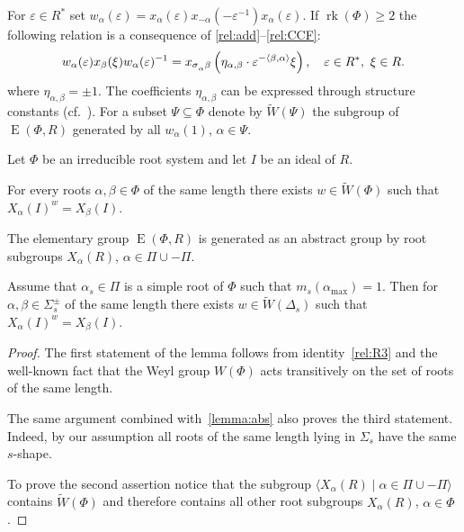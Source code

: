 \documentclass[12pt]{amsart}
\numberwithin{equation}{section}
\theoremstyle{definition}
\DeclareMathOperator{\E}{E}
\DeclareMathOperator{\rk}{rk}
\def\ssub#1{\mathchoice
   {_{\lower2pt\hbox{$\scriptstyle #1$}}}
   {_{\lower2pt\hbox{$\scriptstyle #1$}}}
   {_{\lower1.5pt\hbox{$\scriptscriptstyle #1$}}}
   {_{\!\lower1.5pt\hbox{$\scriptscriptstyle #1$}}}}
\begin{document}
For $\varepsilon\in R^*$ set $w_\alpha(\varepsilon) = x_\alpha(\varepsilon) x_{-\alpha}(-\varepsilon^{-1}) x_{\alpha}(\varepsilon).$
If $\rk(\Phi)\geqslant 2$ the following relation is a consequence of \ref{rel:add}--\ref{rel:CCF}:
\begin{equation}\label{rel:R3}
w_\alpha(\varepsilon) x_{\beta}(\xi) w_\alpha(\varepsilon)^{-1} =
x_{\sigma\ssub{\alpha}\beta} \left(\eta_{\alpha, \beta}\cdot\varepsilon^{-\langle\beta,\alpha \rangle}\xi\right),\quad \varepsilon\in R^*,\ \xi\in R.
\end{equation}
where $\eta_{\alpha, \beta}=\pm 1$. The coefficients $\eta_{\alpha, \beta}$ can be expressed through structure constants (cf.~\cite[\S13]{VP}).
For a subset $\Psi \subseteq \Phi$ denote by $\widetilde{W}(\Psi)$ the subgroup of $\E(\Phi, R)$ generated by all $w_{\alpha}(1)$, $\alpha \in \Psi$.
\begin{lemma} \label{lemma:weylfacts} Let $\Phi$ be an irreducible root system and let $I$ be an ideal of $R$. 
\begin{thmlist}
\item \label{item-trans1} For every roots $\alpha, \beta \in \Phi$ of the same length there exists $w \in \widetilde{W}(\Phi)$ such that $X_{\alpha}(I)^w = X_\beta(I)$.
\item \label{item-egen} The elementary group $\E(\Phi, R)$  is generated as an abstract group by root subgroups $X_{\alpha}(R)$, $\alpha \in \Pi \cup -\Pi$.
\item \label{item-trans2} Assume that $\alpha_s\in \Pi$ is a simple root of $\Phi$ such that $m_s(\alpha_\mathrm{max}) = 1$. 
Then for $\alpha, \beta \in \Sigma^\pm_s$ of the same length there exists $w\in \widetilde{W}(\Delta_s)$ such that $X_\alpha(I)^w = X_\beta(I)$.

\end{thmlist}
\end{lemma}
\begin{proof}
The first statement of the lemma follows from identity~\ref{rel:R3} and the well-known fact that the Weyl group $W(\Phi)$ acts transitively on the set of roots of the same length.
 
The same argument combined with~\cref{lemma:abs} also proves the third statement. Indeed, by our assumption all roots of the same length lying in $\Sigma_s$ have the same $s$-shape.
 
To prove the second assertion notice that the subgroup $\langle X_\alpha(R) \mid \alpha \in \Pi \cup -\Pi \rangle$ contains $\widetilde{W}(\Phi)$ and therefore contains all other root subgroups $X_\alpha(R)$, $\alpha\in \Phi$. \end{proof}
\end{document}
